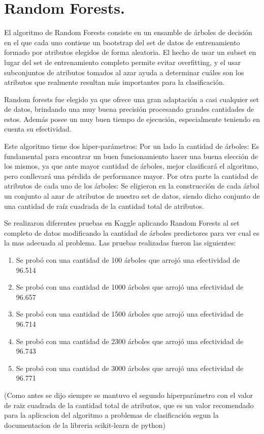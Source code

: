\chapter{Random Forests.}
El algoritmo de Random Forests consiste en un ensamble de árboles de decisión en el que cada uno contiene un bootstrap del set de datos de entrenamiento formado por atributos elegidos de forma aleatoria. El hecho de usar un subset en lugar del set de entrenamiento completo permite evitar overfitting, y el usar subconjuntos de atributos tomados al azar ayuda a determinar cuáles son los atributos que realmente resultan más importantes para la clasificación.

Random forests fue elegido ya que ofrece una gran adaptación a casi cualquier set de datos, brindando una muy buena precisión procesando grandes cantidades de estos. Además posee un muy buen tiempo de ejecución, especialmente teniendo en cuenta su efectividad. 

Este algoritmo tiene dos hiper-parámetros: 
Por un lado la cantidad de árboles: Es fundamental para encontrar un buen funcionamiento hacer una buena elección de los mismos, ya que ante mayor cantidad de árboles, mejor clasificará el algoritmo, pero conllevará una pérdida de performance mayor. 
Por otra parte la cantidad de atributos de cada uno de los árboles:
Se eligieron en la construcción de cada árbol un conjunto al azar de atributos de nuestro set de datos, siendo dicho conjunto de una cantidad de raíz cuadrada de la cantidad total de atributos.

Se realizaron diferentes pruebas en Kaggle aplicando Random Forests al set completo de datos modificando la cantidad de árboles predictores para ver cual es la mas adecuada al problema.
Las pruebas realizadas fueron las siguientes:
\begin{enumerate}
  \item Se probó con una cantidad de 100 árboles que arrojó una efectividad de 96.514%
  \item Se probó con una cantidad de 1000 árboles que arrojó una efectividad de 96.657%
  \item Se probó con una cantidad de 1500 árboles que arrojó una efectividad de 96.714%
  \item Se probó con una cantidad de 2300 árboles que arrojó una efectividad de 96.743%
  \item Se probó con una cantidad de 3000 árboles que arrojó una efectividad de 96.771%
\end{enumerate}
(Como antes se dijo siempre se mantuvo el segundo hiperparámetro con el valor de raiz cuadrada de la cantidad total de atributos, que es un valor recomendado para la aplicacion del algoritmo a problemas de clasificación segun la documentacion de la libreria scikit-learn de python)

